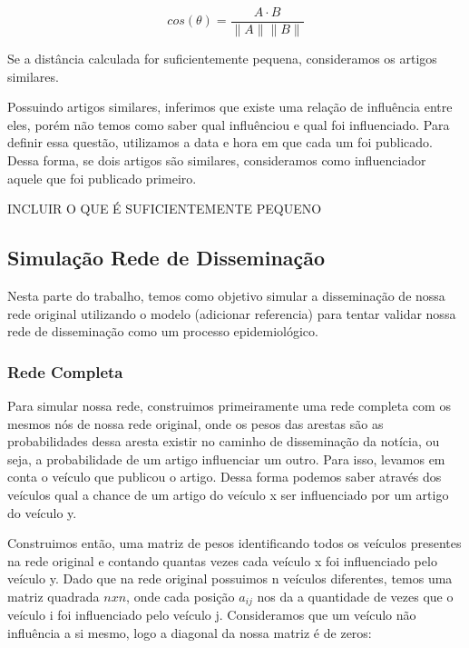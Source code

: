 \documentclass[a4paper,12pt]{article}
\begin{document}
 $$ cos(\theta) = \dfrac{A \cdot B}{\parallel A\parallel \parallel B \parallel} $$
 
 Se a distância calculada for suficientemente pequena, consideramos os artigos similares.
 
 Possuindo artigos similares, inferimos que existe uma relação de influência entre eles, 
 porém não temos como saber qual influênciou e qual foi influenciado. Para definir essa questão, utilizamos a data e hora em que
 cada um foi publicado. Dessa forma, se dois artigos são similares, consideramos como influenciador aquele que foi publicado primeiro. 

 
 INCLUIR O QUE É SUFICIENTEMENTE PEQUENO 
 
\subsection{Simulação Rede de Disseminação}

Nesta parte do trabalho, temos como objetivo simular a disseminação de nossa rede original utilizando o modelo (adicionar referencia)
para tentar validar nossa rede de disseminação como um processo epidemiológico.

\subsubsection{Rede Completa}

 Para simular nossa rede, construimos primeiramente uma rede completa com os mesmos nós de nossa rede original, onde os pesos das arestas
 são as probabilidades dessa aresta existir no caminho de disseminação da notícia, ou seja, a probabilidade de um artigo influenciar um 
 outro. Para isso, levamos em conta o veículo que publicou o artigo. Dessa forma podemos saber 
 através dos veículos qual a chance de um artigo do veículo x ser influenciado por um artigo do veículo y.

 Construimos então, uma matriz de pesos identificando todos os veículos presentes na rede original e contando quantas vezes
 cada veículo x foi influenciado pelo veículo y. Dado que na rede original possuimos n
 veículos diferentes, temos uma matriz quadrada $nxn$, onde cada posição $a_{ij}$ nos da a quantidade de vezes que o veículo i foi influenciado
 pelo veículo j. Consideramos que um veículo não influência a si mesmo, logo a diagonal da nossa matriz é de zeros:
 \pagebreak
 
\end{document}
